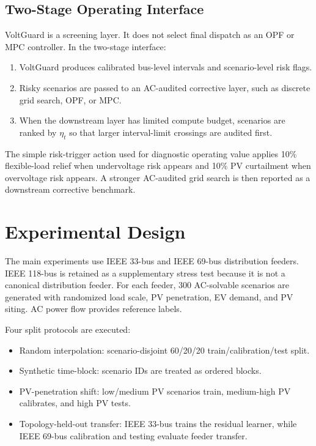 \documentclass[
  preprint,12pt]{elsarticle}
\providecommand{\tightlist}{%
  \setlength{\itemsep}{0pt}\setlength{\parskip}{0pt}}
\begin{document}
\subsection{Two-Stage Operating
Interface}\label{two-stage-operating-interface}

VoltGuard is a screening layer. It does not select final dispatch as an
OPF or MPC controller. In the two-stage interface:

\begin{enumerate}
\def\labelenumi{\arabic{enumi}.}
\tightlist
\item
  VoltGuard produces calibrated bus-level intervals and scenario-level
  risk flags.
\item
  Risky scenarios are passed to an AC-audited corrective layer, such as
  discrete grid search, OPF, or MPC.
\item
  When the downstream layer has limited compute budget, scenarios are
  ranked by \(\eta_t\) so that larger interval-limit crossings are
  audited first.
\end{enumerate}

The simple risk-trigger action used for diagnostic operating value
applies 10\% flexible-load relief when undervoltage risk appears and
10\% PV curtailment when overvoltage risk appears. A stronger AC-audited
grid search is then reported as a downstream corrective benchmark.

\section{Experimental Design}\label{experimental-design}

The main experiments use IEEE 33-bus and IEEE 69-bus distribution
feeders. IEEE 118-bus is retained as a supplementary stress test because
it is not a canonical distribution feeder. For each feeder, 300
AC-solvable scenarios are generated with randomized load scale, PV
penetration, EV demand, and PV siting. AC power flow provides reference
labels.

Four split protocols are executed:

\begin{itemize}
\tightlist
\item
  Random interpolation: scenario-disjoint 60/20/20
  train/calibration/test split.
\item
  Synthetic time-block: scenario IDs are treated as ordered blocks.
\item
  PV-penetration shift: low/medium PV scenarios train, medium-high PV
  calibrates, and high PV tests.
\item
  Topology-held-out transfer: IEEE 33-bus trains the residual learner,
  while IEEE 69-bus calibration and testing evaluate feeder transfer.
\end{itemize}
\end{document}
